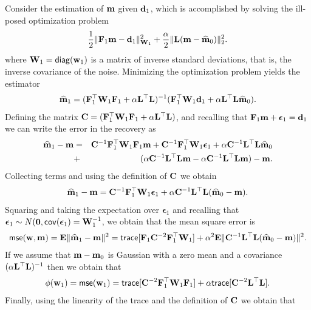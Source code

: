 \documentclass[11pt]{article}
\newcommand{\bfC}	{{\bf{C}}}
\newcommand{\bfE}	{{\bf{E}}}
\newcommand{\bfF}	{{\bf{F}}}
\newcommand{\bfL}	{{\bf{L}}}
\newcommand{\bfW}	{{\bf{W}}}
\newcommand{\bfd}	{{\bf{d}}}
\newcommand{\bfm}	{{\bf{m}}}
\newcommand{\bfw}	{{\bf{w}}}
\newcommand{\hf}        {{\frac 12}}
\newcommand{\bfepsilon} {{\boldsymbol \epsilon}}
\newcommand{\LtL}       { \bfL^{\top}\bfL}
\newcommand {\zero}  { {\bf 0} }
\renewcommand{\hf}		 {\frac12}
\newcommand{\bfmhat}    {{\widehat{\bfm}}}
\begin{document}
Consider  the estimation of $\bfm$ given $\bfd_{1}$, which is accomplished by solving the ill-posed optimization problem
\begin{eqnarray*}
\label{mest1}
\hf \| \bfF_{1} \bfm - \bfd_{1}\|^{2}_{\bfW_{1}} + {\frac {\alpha} 2}
\|\bfL (\bfm - \bfmhat_{0}) \|^{2}_2. 
\end{eqnarray*}
where $\bfW_{1} = {\sf diag}(\bfw_{1})$ is a matrix of inverse standard deviations, 
that is, the inverse covariance of the noise.
Minimizing the  optimization problem yields the estimator
\begin{eqnarray}
\label{mest}
\widehat \bfm_{1} = (\bfF_{1}^{\top} \bfW_{1}\bfF_{1} + \alpha \bfL^{\top} \bfL)^{-1} (\bfF_{1}^{\top} \bfW_{1} \bfd_{1}
+ \alpha \LtL \bfmhat_{0}).
\end{eqnarray}
Defining the matrix $\bfC = (\bfF_{1}^{\top} \bfW_{1}\bfF_{1} + \alpha \LtL)$, and recalling that $\bfF_1\bfm + \bfepsilon_1 = \bfd_1$ we can write
the error in the recovery as
\begin{eqnarray}
\bfmhat_1 -\bfm &=& \bfC^{-1} \bfF_{1}^{\top} \bfW_{1}\bfF_{1} \bfm + \bfC^{-1} \bfF_{1}^{\top} \bfW_{1}\bfepsilon_1 + \alpha
\bfC^{-1} \LtL \bfmhat_{0} \\
\nonumber
&+& (\alpha \bfC^{-1} \LtL\bfm
- \alpha \bfC^{-1} \LtL \bfm) 
 -\bfm.
\end{eqnarray}
Collecting terms and using the definition of $\bfC$ we obtain
\begin{eqnarray}
\label{diffmod}
\bfmhat_1 -\bfm = \bfC^{-1} \bfF_{1}^{\top} \bfW_{1} \bfepsilon_1 + \alpha \bfC^{-1} \LtL (\bfmhat_{0} - \bfm).
\end{eqnarray}
Squaring and taking the expectation over $\bfepsilon_1$ and recalling that $ \bfepsilon_1 \sim N(\zero,{\sf cov}(\bfepsilon_1) = \bfW_{1}^{-1}$, we obtain that the mean square error is
\begin{eqnarray}
{\sf mse}(\bfw,\bfm) = \bfE\| \bfmhat_1 -\bfm \|^{2} = {\sf trace}[   \bfF_{1} \bfC^{-2} \bfF_{1}^{\top} \bfW_{1}]  + 
\alpha^2 \bfE\| \bfC^{-1} \LtL (\bfmhat_{0} - \bfm) \|^{2}.
\end{eqnarray}
If we assume that $\bfm-\bfm_{0}$ is Gaussian with a zero mean and a covariance
$(\alpha \LtL)^{-1}$ then we obtain that
\begin{eqnarray}
\phi(\bfw_1 ) = {\sf mse}(\bfw_1) = {\sf trace}[    \bfC^{-2} \bfF_{1}^{\top}\bfW_{1}\bfF_{1}]  + 
 \alpha {\sf trace} [\bfC^{-2} \LtL] . 
\end{eqnarray}
Finally, using the linearity of the trace and the definition of $\bfC$ we obtain that
\end{document}
